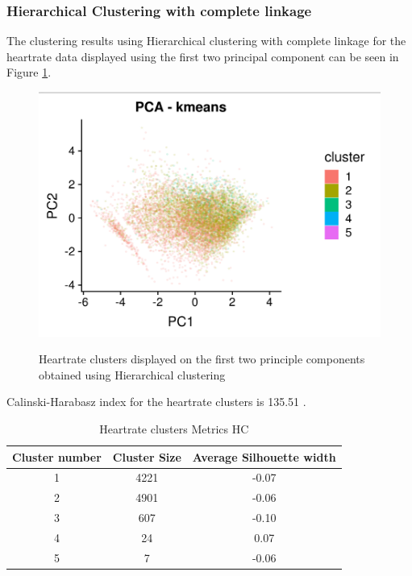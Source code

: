 \documentclass{article}
\begin{document}
\subsubsection{Hierarchical Clustering with complete linkage}

The clustering results using Hierarchical clustering with complete linkage for the heartrate data displayed using the first two principal component can be seen in Figure \ref{fig:hrClustersHC}.

\begin{figure}[htb]
  \centering
  \caption{Heartrate clusters displayed on the first two principle components obtained using Hierarchical clustering}
  \includegraphics[]{hr_HC_results.png}
  \label{fig:hrClustersHC}
\end{figure}

Calinski-Harabasz index for the heartrate clusters is 135.51 .

\begin{table}[H]
  \caption{Heartrate clusters Metrics HC}
  \label{hr_metrics}
  \centering
  \begin{tabular}{ c|c|c}
    \toprule
    \cmidrule(r){1-2}
    Cluster number & Cluster Size & Average Silhouette width \\
    \midrule
    1 & 4221 & -0.07 \\
    2 & 4901 & -0.06 \\
    3 & 607 & -0.10 \\
    4 & 24 & 0.07 \\
    5 & 7 & -0.06 \\
    \bottomrule
    \end{tabular}
\end{table}
\end{document}
